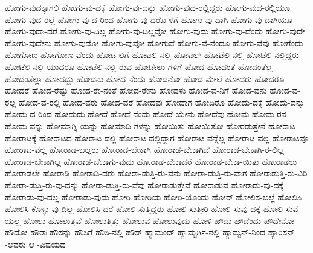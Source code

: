 {ಹೋಗು-ವುದಕ್ಕಾಗಲಿ
ಹೋಗು-ವು-ದಕ್ಕೆ
ಹೋಗು-ವು-ದನ್ನು
ಹೋಗು-ವುದ-ರಲ್ಲಿದ್ದರು
ಹೋಗು-ವುದ-ರಲ್ಲಿಯೂ
ಹೋಗು-ವುದ-ರಲ್ಲೆ
ಹೋಗು-ವು-ದ-ರಿಂದ
ಹೋಗು-ವು-ದರೊ-ಳಗೆ
ಹೋಗು-ವು-ದಾಗಿ
ಹೋಗು-ವು-ದಾಗಿಯೂ
ಹೋಗು-ವುದಾ-ದರೆ
ಹೋಗು-ವು-ದಿಲ್ಲ
ಹೋಗು-ವು-ದಿಲ್ಲವೋ
ಹೋಗು-ವುದು
ಹೋಗು-ವು-ದೆಂದು
ಹೋಗು-ವುದೇ
ಹೋಗು-ವುದೇನು
ಹೋಗು-ವುದೋ
ಹೋಗು-ವುವೋ
ಹೋಗುವೆ
ಹೋಗು-ವೆ-ನೆಂದೂ
ಹೋಗು-ವೆವು
ಹೋಗೆಂದು
ಹೋಗೋಣ
ಹೋಗೋಣ-ವೆಂದು
ಹೋಟ-ಲಿಗೆ
ಹೋಟಲಿ-ನಲ್ಲಿ
ಹೋಟಲ್
ಹೋಟೆಲಿ-ನಲ್ಲಿ
ಹೋಟೆಲಿ-ನಲ್ಲಿದ್ದರು
ಹೋಟೆಲಿ-ನಲ್ಲಿ-ಯಾದರೂ
ಹೋಟೆಲಿ-ನಲ್ಲಿ-ರುವ
ಹೋಟೇಲು-ಗಳಿಗೆ
ಹೋದ
ಹೋದಂತೆ
ಹೋದಂತೆಲ್ಲ
ಹೋದಂತೆಲ್ಲಾ
ಹೋದದ್ದು
ಹೋದನು
ಹೋದ-ನೆಂದು
ಹೋದನೋ
ಹೋದ-ಮೇಲೆ
ಹೋದರು
ಹೋದರೂ
ಹೋದರೆ
ಹೋದ-ರೆಷ್ಟು
ಹೋದ-ರೇ-ನಂತೆ
ಹೋದ-ರೇನು
ಹೋದಳು
ಹೋದ-ವ-ನಿಗೆ
ಹೋದ-ವನು
ಹೋದ-ವ-ರಲ್ಲ
ಹೋದ-ವ-ರಲ್ಲಿ
ಹೋದ-ವರು
ಹೋದ-ವರೆ
ಹೋದವು
ಹೋದಾಗ
ಹೋದಿರೊ
ಹೋದು-ದಕ್ಕೆ
ಹೋದು-ದನ್ನು
ಹೋದು-ದ-ರಿಂದ
ಹೋದುದು
ಹೋದೆ
ಹೋದೆ-ನೆಂದು
ಹೋದೆ-ಯೇನು
ಹೋದೆವು
ಹೋಮ
ಹೋಮ-ರನ
ಹೋಮ-ವನ್ನು
ಹೋಮಾಗ್ನಿ-ಯನ್ನು
ಹೋಮಾದಿ-ಗಳನ್ನು
ಹೋಯಿತು
ಹೋಯಿತೋ
ಹೋರಡುತ್ತೇನೆ
ಹೋರಾಟ
ಹೋರಾಟಕ್ಕೆ
ಹೋರಾಟದ
ಹೋರಾಟ-ದಲ್ಲಿ
ಹೋರಾಟ-ದಲ್ಲಿದ್ದಾಗ
ಹೋರಾಟ-ವನ್ನೆಲ್ಲ
ಹೋರಾಟ-ವಲ್ಲ
ಹೋರಾಟವೂ
ಹೋರಾಟ-ವೆಲ್ಲ
ಹೋರಾಡ-ಬಲ್ಲರು
ಹೋರಾಡ-ಬೇಕಾಗಿ
ಹೋರಾಡ-ಬೇಕಾಗಿದೆ
ಹೋರಾಡ-ಬೇಕಾಗಿ-ರ-ಲಿಲ್ಲ
ಹೋರಾಡ-ಬೇಕಾಗಿಲ್ಲ
ಹೋರಾಡ-ಬೇಕಾಗು-ವುದು
ಹೋರಾಡ-ಬೇಕಾದರೆ
ಹೋರಾಡ-ಬೇಕಾ-ಯಿತು
ಹೋರಾಡಲು
ಹೋರಾಡಲೇ
ಹೋರಾಡಿ
ಹೋರಾಡಿ-ದರು
ಹೋರಾ-ಡುತ್ತಿ-ರು-ವನು
ಹೋರಾ-ಡುತ್ತಿ-ರು-ವಾಗ
ಹೋರಾಡುತ್ತಿ-ರು-ವಿರಿ
ಹೋರಾ-ಡುತ್ತಿ-ರು-ವು-ದನ್ನು
ಹೋರಾ-ಡುತ್ತಿ-ರು-ವೆವು
ಹೋರಾಡುತ್ತೇವೆ
ಹೋರಾಡುವ
ಹೋರಾಡು-ವು-ದಕ್ಕೆ
ಹೋರಾಡು-ವು-ದಲ್ಲ
ಹೋರಾಡು-ವುದು
ಹೋರಿ
ಹೋರಿಯ
ಹೋರಿ-ಯೊಂದು
ಹೋರ್
ಹೋಲಿಸ-ಬಲ್ಲೆ
ಹೋಲಿಸಿ
ಹೋಲಿಸಿ-ಕೊಳ್ಳು-ವು-ದಿಲ್ಲ
ಹೋಲಿಸಿ-ದರೆ
ಹೋಲಿ-ಸುತ್ತಿದ್ದರು
ಹೋಲಿ-ಸುತ್ತೀರಿ
ಹೋಲಿ-ಸುವು-ದಕ್ಕೆ
ಹೋಲಿ-ಸುವೆ-ಯಲ್ಲ
ಹೋಲು
ಹೋಲುತ್ತವೆ
ಹೋಲುತ್ತಿತ್ತು
ಹೋಲುವ
ಹೋಲುವುದು
ಹೋಳಿ
ಹೌದು
ಹೌದೆಂದು
ಹೌದೇನೋ
ಹೌದೋ
ಹೌರಾ
ಹೌಸನ್ನು
ಹೌಸಿಗೆ
ಹೌಸಿ-ನಲ್ಲಿ
ಹೌಸ್
ಹ್ಯಾಮಂಡ್
ಹ್ಯಾಮ್ಬರ್ಗಿ-ನಲ್ಲಿ
ಹ್ಯಾಮ್ಟನ್-ನಿಂದ
ಹ್ಯಾರಿಸನ್
-ಅವರು
ಆ
-ವಿಷಯದ
}
